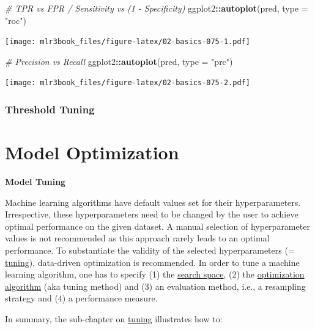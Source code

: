 \documentclass[]{article}
\newenvironment{Shaded}{\begin{snugshade}}{\end{snugshade}}
\newcommand{\CommentTok}[1]{\textcolor[rgb]{0.56,0.35,0.01}{\textit{#1}}}
\newcommand{\DataTypeTok}[1]{\textcolor[rgb]{0.13,0.29,0.53}{#1}}
\newcommand{\KeywordTok}[1]{\textcolor[rgb]{0.13,0.29,0.53}{\textbf{#1}}}
\newcommand{\NormalTok}[1]{#1}
\newcommand{\OperatorTok}[1]{\textcolor[rgb]{0.81,0.36,0.00}{\textbf{#1}}}
\newcommand{\StringTok}[1]{\textcolor[rgb]{0.31,0.60,0.02}{#1}}
\renewenvironment{Shaded} {\begin{snugshade}\small} {\end{snugshade}}
\begin{document}
\begin{Shaded}
\begin{Highlighting}[]
\CommentTok{# TPR vs FPR / Sensitivity vs (1 - Specificity)}
\NormalTok{ggplot2}\OperatorTok{::}\KeywordTok{autoplot}\NormalTok{(pred, }\DataTypeTok{type =} \StringTok{"roc"}\NormalTok{)}
\end{Highlighting}
\end{Shaded}

\texttt{[image: mlr3book\_files/figure-latex/02-basics-075-1.pdf]}

\begin{Shaded}
\begin{Highlighting}[]
\CommentTok{# Precision vs Recall}
\NormalTok{ggplot2}\OperatorTok{::}\KeywordTok{autoplot}\NormalTok{(pred, }\DataTypeTok{type =} \StringTok{"prc"}\NormalTok{)}
\end{Highlighting}
\end{Shaded}

\texttt{[image: mlr3book\_files/figure-latex/02-basics-075-2.pdf]}

\hypertarget{threshold-tuning}{%
\subsubsection{Threshold Tuning}\label{threshold-tuning}}

\hypertarget{model-optim}{%
\section{Model Optimization}\label{model-optim}}

\textbf{Model Tuning}

Machine learning algorithms have default values set for their hyperparameters.
Irrespective, these hyperparameters need to be changed by the user to achieve optimal performance on the given dataset.
A manual selection of hyperparameter values is not recommended as this approach rarely leads to an optimal performance.
To substantiate the validity of the selected hyperparameters (= \protect\hyperlink{tuning}{tuning}), data-driven optimization is recommended.
In order to tune a machine learning algorithm, one has to specify (1) the \protect\hyperlink{tuning-optimization}{search space}, (2) the \protect\hyperlink{tuning-optimization}{optimization algorithm} (aka tuning method) and (3) an evaluation method, i.e., a resampling strategy and (4) a performance measure.

In summary, the sub-chapter on \protect\hyperlink{tuning}{tuning} illustrates how to:
\end{document}

